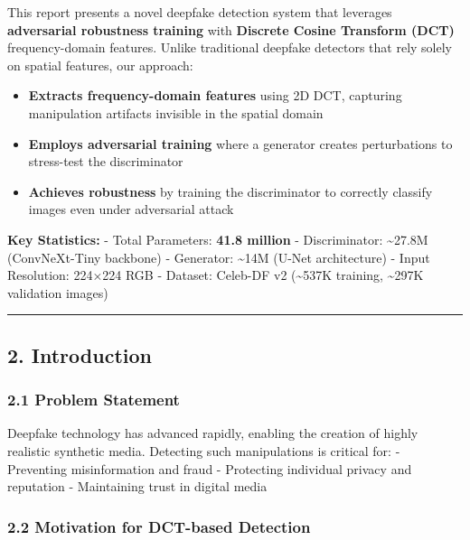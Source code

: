This report presents a novel deepfake detection system that leverages
\textbf{adversarial robustness training} with \textbf{Discrete Cosine
Transform (DCT)} frequency-domain features. Unlike traditional deepfake
detectors that rely solely on spatial features, our approach:

\begin{itemize}
\tightlist
\item
  \textbf{Extracts frequency-domain features} using 2D DCT, capturing
  manipulation artifacts invisible in the spatial domain
\item
  \textbf{Employs adversarial training} where a generator creates
  perturbations to stress-test the discriminator
\item
  \textbf{Achieves robustness} by training the discriminator to
  correctly classify images even under adversarial attack
\end{itemize}

\textbf{Key Statistics:} - Total Parameters: \textbf{41.8 million} -
Discriminator: \textasciitilde27.8M (ConvNeXt-Tiny backbone) -
Generator: \textasciitilde14M (U-Net architecture) - Input Resolution:
224×224 RGB - Dataset: Celeb-DF v2 (\textasciitilde537K training,
\textasciitilde297K validation images)

\begin{center}\rule{0.5\linewidth}{0.5pt}\end{center}

\subsection{2. Introduction}\label{introduction}

\subsubsection{2.1 Problem Statement}\label{problem-statement}

Deepfake technology has advanced rapidly, enabling the creation of
highly realistic synthetic media. Detecting such manipulations is
critical for: - Preventing misinformation and fraud - Protecting
individual privacy and reputation - Maintaining trust in digital media

\subsubsection{2.2 Motivation for DCT-based
Detection}\label{motivation-for-dct-based-detection}

